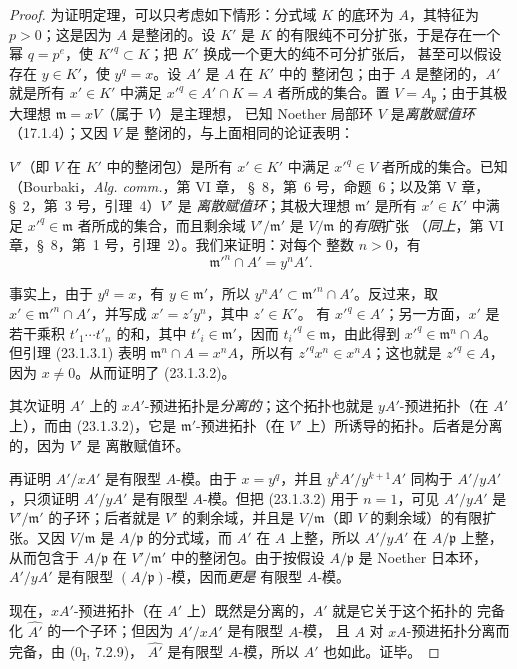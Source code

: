 \begin{proof}
为证明定理，可以只考虑如下情形：分式域 $K$ 的底环为 $A$，其特征为
$p>0$；这是因为 $A$ 是整闭的。设 $K'$ 是 $K$ 的有限纯不可分扩张，于是存在一个幂
$q=p^e$，使 $K'^q\subset K$；把 $K'$ 换成一个更大的纯不可分扩张后，
甚至可以假设存在 $y\in K'$，使 $y^q=x$。设 $A'$ 是 $A$ 在 $K'$ 中的
整闭包；由于 $A$ 是整闭的，$A'$ 就是所有 $x'\in K'$ 中满足
$x'^q\in A'\cap K=A$ 者所成的集合。置
$V=A_{\mathfrak p}$；由于其极大理想 $\mathfrak m=xV$（属于 $V$）是主理想，
已知 Noether 局部环 $V$ 是\emph{离散赋值环}（17.1.4）；又因 $V$ 是
整闭的，与上面相同的论证表明：


$V'$（即 $V$ 在 $K'$ 中的整闭包）是所有 $x'\in K'$ 中满足
$x'^q\in V$ 者所成的集合。已知（Bourbaki，\emph{Alg. comm.}，第 VI 章，
§~8，第~6 号，命题~6；以及第 V 章，§~2，第~3 号，引理~4）$V'$ 是
\emph{离散赋值环}；其极大理想 $\mathfrak m'$ 是所有 $x'\in K'$ 中满足
$x'^q\in\mathfrak m$ 者所成的集合，而且剩余域
$V'/\mathfrak m'$ 是 $V/\mathfrak m$ 的\emph{有限}扩张
（\emph{同上}，第 VI 章，§~8，第~1 号，引理~2）。我们来证明：对每个
整数 $n>0$，有
\begin{equation}
\label{0.23.1.3.2-fr}
  \mathfrak m'^n\cap A'=y^nA'.
  \tag{23.1.3.2}
\end{equation}

事实上，由于 $y^q=x$，有 $y\in\mathfrak m'$，所以
$y^nA'\subset\mathfrak m'^n\cap A'$。反过来，取
$x'\in\mathfrak m'^n\cap A'$，并写成 $x'=z'y^n$，其中 $z'\in K'$。
有 $x'^q\in A'$；另一方面，$x'$ 是若干乘积
$t'_1\cdots t'_n$ 的和，其中 $t'_i\in\mathfrak m'$，因而
$t_i'^q\in\mathfrak m$，由此得到 $x'^q\in\mathfrak m^n\cap A$。
但引理 (23.1.3.1) 表明 $\mathfrak m^n\cap A=x^nA$，所以有
$z'^qx^n\in x^nA$；这也就是 $z'^q\in A$，因为 $x\neq0$。从而证明了
(23.1.3.2)。

其次证明 $A'$ 上的 $xA'$-预进拓扑是\emph{分离的}；这个拓扑也就是
$yA'$-预进拓扑（在 $A'$ 上），而由 (23.1.3.2)，它是
$\mathfrak m'$-预进拓扑（在 $V'$ 上）所诱导的拓扑。后者是分离的，因为 $V'$ 是
离散赋值环。

再证明 $A'/xA'$ 是有限型 $A$-模。由于 $x=y^q$，并且
$y^kA'/y^{k+1}A'$ 同构于 $A'/yA'$，只须证明 $A'/yA'$ 是有限型
$A$-模。但把 (23.1.3.2) 用于 $n=1$，可见 $A'/yA'$ 是
$V'/\mathfrak m'$ 的子环；后者就是 $V'$ 的剩余域，并且是
$V/\mathfrak m$（即 $V$ 的剩余域）的有限扩张。又因 $V/\mathfrak m$ 是
$A/\mathfrak p$ 的分式域，而 $A'$ 在 $A$ 上整，所以 $A'/yA'$ 在
$A/\mathfrak p$ 上整，从而包含于 $A/\mathfrak p$ 在
$V'/\mathfrak m'$ 中的整闭包。由于按假设 $A/\mathfrak p$ 是 Noether
日本环，$A'/yA'$ 是有限型 $(A/\mathfrak p)$-模，因而\emph{更是}
有限型 $A$-模。

现在，$xA'$-预进拓扑（在 $A'$ 上）既然是分离的，$A'$ 就是它关于这个拓扑的
完备化 $\widehat{A'}$ 的一个子环；但因为 $A'/xA'$ 是有限型 $A$-模，
且 $A$ 对 $xA$-预进拓扑分离而完备，由 (0\textsubscript{I}, 7.2.9)，
$\widehat{A'}$ 是有限型 $A$-模，所以 $A'$ 也如此。证毕。
\end{proof}

